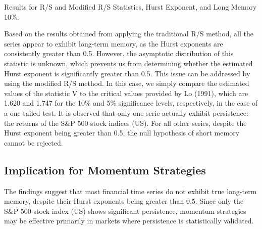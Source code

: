 \documentclass[11pt]{extarticle}
\begin{document}
\begin{table}[h!]
    \centering
    \caption{Results for R/S and Modified R/S Statistics, Hurst Exponent, and Long Memory 10\%.}
    \label{tab:hurst_results}
\end{table}

\FloatBarrier


Based on the results obtained from applying the traditional R/S method, all the series appear to exhibit long-term memory,
as the Hurst exponents are consistently greater than 0.5. However, the asymptotic distribution of this statistic is unknown,
which prevents us from determining whether the estimated Hurst exponent is significantly greater than 0.5. This issue can be
addressed by using the modified R/S method. In this case, we simply compare the estimated values of the statistic V to the
critical values provided by Lo (1991), which are 1.620 and 1.747 for the 10\% and 5\% significance levels, respectively,
in the case of a one-tailed test. It is observed that only one serie actually exhibit persistence: the returns of the S\&P 500 stock indices (US).
For all other series, despite the Hurst exponent being greater than 0.5, the null hypothesis
of short memory cannot be rejected.

\subsection*{Implication for Momentum Strategies}
The findings suggest that most financial time series do not exhibit true long-term memory, despite their Hurst exponents being greater than 0.5.
Since only the S\&P 500 stock index (US) shows significant persistence, momentum strategies may be effective primarily in markets where persistence is statistically validated.
\end{document}
